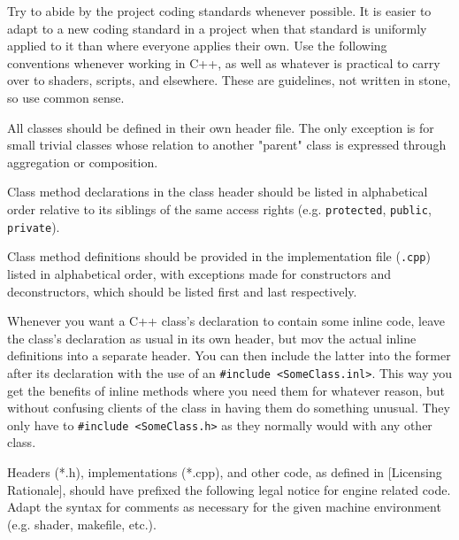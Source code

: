 

Try to abide by the project coding standards whenever possible. It is easier to adapt to a new coding standard in a project when that standard is uniformly applied to it than where everyone applies their own. Use the following conventions whenever working in C++, as well as whatever is practical to carry over to shaders, scripts, and elsewhere. These are guidelines, not written in stone, so use common sense.


\startitemize[4]
\item
All classes should be defined in their own header file. The only exception is for small trivial classes whose relation to another "parent" class is expressed through aggregation or composition.

\item
Class method declarations in the class header should be listed in alphabetical order relative to its siblings of the same access rights (e.g. {\tt protected}, {\tt public}, {\tt private}).

\item
Class method definitions should be provided in the implementation file ({\tt *.cpp}) listed in alphabetical order, with exceptions made for constructors and deconstructors, which should be listed first and last respectively.

\item
Whenever you want a C++ class's declaration to contain some inline code, leave the class's declaration as usual in its own header, but mov the actual inline definitions into a separate header. You can then include the latter into the former after its declaration with the use of an {\tt \#include <SomeClass.inl>}. This way you get the benefits of inline methods where you need them for whatever reason, but without confusing clients of the class in having them do something unusual. They only have to {\tt \#include <SomeClass.h>} as they normally would with any other class.
\stopitemize

Headers (*.h), implementations (*.cpp), and other code, as defined in [Licensing Rationale], should have prefixed the following legal notice for engine related code. Adapt the syntax for comments as necessary for the given machine environment (e.g. shader, makefile, etc.).

